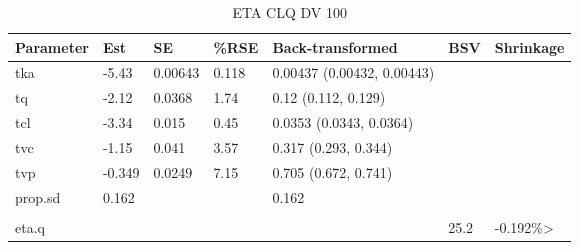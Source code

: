 \begin{table}
\centering\centering
\caption{ETA CLQ DV 100}
\centering
\fontsize{8}{10}\selectfont
\begin{tabular}[t]{lllllll}
\toprule
\textbf{Parameter} & \textbf{Est} & \textbf{SE} & \textbf{\%RSE} & \textbf{Back-transformed} & \textbf{BSV} & \textbf{Shrinkage}\\
\midrule
tka & -5.43 & 0.00643 & 0.118 & 0.00437 (0.00432, 0.00443) &  & \\
\midrule
tq & -2.12 & 0.0368 & 1.74 & 0.12 (0.112, 0.129) &  & \\
\midrule
tcl & -3.34 & 0.015 & 0.45 & 0.0353 (0.0343, 0.0364) &  & \\
\midrule
tvc & -1.15 & 0.041 & 3.57 & 0.317 (0.293, 0.344) &  & \\
\midrule
tvp & -0.349 & 0.0249 & 7.15 & 0.705 (0.672, 0.741) &  & \\
\midrule
prop.sd & 0.162 &  &  & 0.162 &  & \\
\midrule\\
eta.q &  &  &  &  & 25.2 & -0.192\%>\\
\bottomrule
\end{tabular}
\end{table}